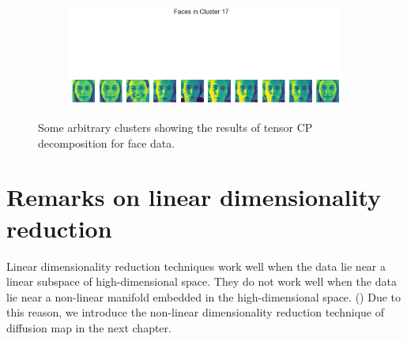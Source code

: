 \begin{figure}[H]
\begin{subfigure}[b]{0.45\textwidth}
    \end{subfigure}
    \hfill
    \begin{subfigure}[b]{0.45\textwidth}
        \includegraphics[width=\textwidth]{presentation/figures-face-results/face17.png}
    \end{subfigure}
    \caption{Some arbitrary clusters showing the results of tensor CP decomposition for face data.}
    \end{figure} 
    
\section{Remarks on linear dimensionality reduction}
Linear dimensionality reduction techniques work well when the data lie near a linear subspace of high-dimensional space. They do not work well when the data lie near a non-linear manifold embedded in the high-dimensional space. (\cite{fefferman_testing_2016}) Due to this reason, we introduce the non-linear dimensionality reduction technique of diffusion map in the next chapter. 